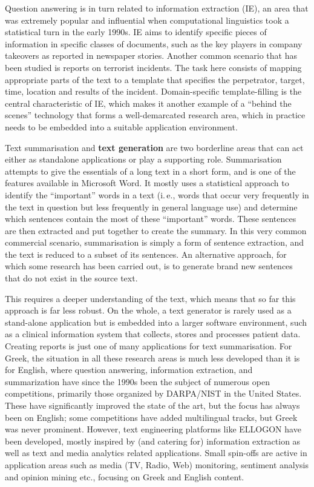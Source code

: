 \documentclass[]{../../metanetpaper}
\begin{document}
\begin{multicols}{2}
Question answering is in turn related to information extraction (IE), an area that was extremely popular and influential when computational linguistics took a statistical turn in the early 1990s. IE aims to identify specific pieces of information in specific classes of documents, such as the key players in company takeovers as reported in newspaper stories. Another common scenario that has been studied is reports on terrorist incidents. The task here consists of mapping appropriate parts of the text to a template that specifies the perpetrator, target, time, location and results of the incident. Domain-specific template-filling is the central characteristic of IE, which makes it another example of a “behind the scenes” technology that forms a well-demarcated research area, which in practice needs to be embedded into a suitable application environment. 

Text summarisation and \textbf{text generation} are two borderline areas that can act either as standalone applications or play a supporting role. Summarisation attempts to give the essentials of a long text in a short form, and is one of the features available in Microsoft Word. It mostly uses a statistical approach to identify the “important” words in a text (i.\,e., words that occur very frequently in the text in question but less frequently in general language use) and determine which sentences contain the most of these “important” words. These sentences are then extracted and put together to create the summary. In this very common commercial scenario, summarisation is simply a form of sentence extraction, and the text is reduced to a subset of its sentences. An alternative approach, for which some research has been carried out, is to generate brand new sentences that do not exist in the source text. 


This requires a deeper understanding of the text, which means that so far this approach is far less robust. On the whole, a text generator is rarely used as a stand-alone application but is embedded into a larger software environment, such as a clinical information system that collects, stores and processes patient data. Creating reports is just one of many applications for text summarisation. 
For Greek, the situation in all these research areas is much less developed than it is for English, where question answering, information extraction, and summarization have since the 1990s been the subject of numerous open competitions, primarily those organized by DARPA/NIST in the United States. These have significantly improved the state of the art, but the focus has always been on English; some competitions have added multilingual tracks, but Greek was never prominent. However, text engineering platforms like ELLOGON have been developed, mostly inspired by (and catering for) information extraction as well as text and media analytics related applications. Small spin-offs are active in application areas such as media (TV, Radio, Web) monitoring, sentiment analysis and opinion mining etc., focusing on Greek and English content.


\end{multicols}
\end{document}
